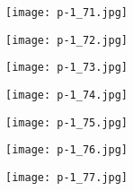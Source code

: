 \clearpage


\begin{figure}
    \begin{center}
        \texttt{[image: p-1\_71.jpg]}
        \caption{}
    \end{center}
\end{figure}

\clearpage


\begin{figure}
    \begin{center}
        \texttt{[image: p-1\_72.jpg]}
        \caption{}
    \end{center}
\end{figure}

\clearpage


\begin{figure}
    \begin{center}
        \texttt{[image: p-1\_73.jpg]}
        \caption{}
    \end{center}
\end{figure}

\clearpage


\begin{figure}
    \begin{center}
        \texttt{[image: p-1\_74.jpg]}
        \caption{}
    \end{center}
\end{figure}

\clearpage


\begin{figure}
    \begin{center}
        \texttt{[image: p-1\_75.jpg]}
        \caption{}
    \end{center}
\end{figure}

\clearpage


\begin{figure}
    \begin{center}
        \texttt{[image: p-1\_76.jpg]}
        \caption{}
    \end{center}
\end{figure}

\clearpage


\begin{figure}
    \begin{center}
        \texttt{[image: p-1\_77.jpg]}
        \caption{}
    \end{center}
\end{figure}

